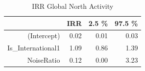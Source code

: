 \begin{table}[ht]
\centering
\begin{tabular}{rrrr}
  \hline
 & IRR & 2.5 \% & 97.5 \% \\ 
  \hline
(Intercept) & 0.02 & 0.01 & 0.03 \\ 
  Is\_International1 & 1.09 & 0.86 & 1.39 \\ 
  NoiseRatio & 0.12 & 0.00 & 3.23 \\ 
   \hline
\end{tabular}
\caption{IRR Global North Activity} 
\end{table}
